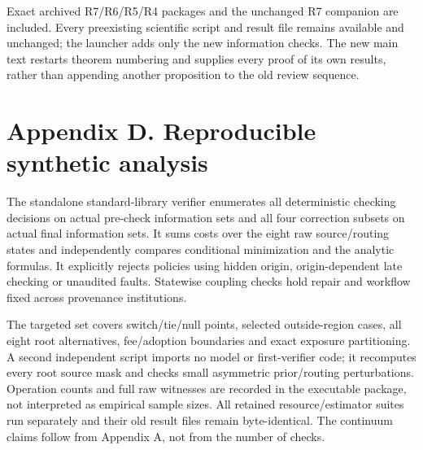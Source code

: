 \documentclass[
  11pt,
  a4paper,
]{article}
\begin{document}
Exact archived R7/R6/R5/R4 packages and the unchanged R7 companion are
included. Every preexisting scientific script and result file remains
available and unchanged; the launcher adds only the new information
checks. The new main text restarts theorem numbering and supplies every
proof of its own results, rather than appending another proposition to
the old review sequence.

\section{Appendix D. Reproducible synthetic
analysis}\label{appendix-d.-reproducible-synthetic-analysis}

The standalone standard-library verifier enumerates all deterministic
checking decisions on actual pre-check information sets and all four
correction subsets on actual final information sets. It sums costs over
the eight raw source/routing states and independently compares
conditional minimization and the analytic formulas. It explicitly
rejects policies using hidden origin, origin-dependent late checking or
unaudited faults. Statewise coupling checks hold repair and workflow
fixed across provenance institutions.

The targeted set covers switch/tie/null points, selected outside-region
cases, all eight root alternatives, fee/adoption boundaries and exact
exposure partitioning. A second independent script imports no model or
first-verifier code; it recomputes every root source mask and checks
small asymmetric prior/routing perturbations. Operation counts and full
raw witnesses are recorded in the executable package, not interpreted as
empirical sample sizes. All retained resource/estimator suites run
separately and their old result files remain byte-identical. The
continuum claims follow from Appendix A, not from the number of checks.
\end{document}
